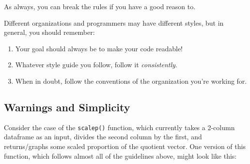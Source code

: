 \documentclass[
]{book}
\providecommand{\tightlist}{%
  \setlength{\itemsep}{0pt}\setlength{\parskip}{0pt}}
\begin{document}
As always, you can break the rules if you have a good reason to.

Different organizations and programmers may have different styles, but in general, you should remember:

\begin{enumerate}
\def\labelenumi{\arabic{enumi}.}
\tightlist
\item
  Your goal should always be to make your code readable!
\item
  Whatever style guide you follow, follow it \emph{consistently}.
\item
  When in doubt, follow the conventions of the organization you're working for.
\end{enumerate}

\hypertarget{warnings-and-simplicity}{%
\subsection{Warnings and Simplicity}\label{warnings-and-simplicity}}

Consider the case of the \texttt{scalep()} function, which currently takes a 2-column dataframe as an input, divides the second column by the first, and returns/graphs some scaled proportion of the quotient vector. One version of this function, which follows almost all of the guidelines above, might look like this:
\end{document}
